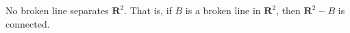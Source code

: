 No broken line separates $\mathbf{R}^2$. That is, if $B$ is a broken line in $\mathbf{R}^2$, then $\mathbf{R}^2 - B$ is connected.
